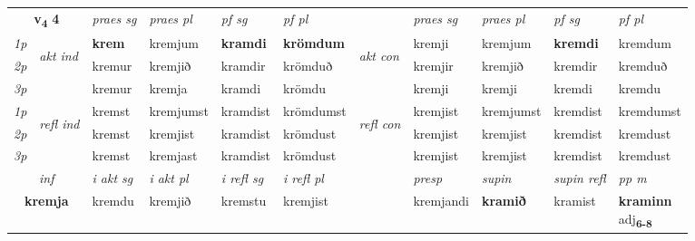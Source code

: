 \noindent
\begin{tabular}{lllllllllll} \toprule
\multicolumn{2}{c}{\textbf{v{\textsubscript{4}}} \Large{\textbf{4}}}  &  \textit{praes sg}  & \textit{praes pl}  &\textit{ pf sg} & \textit{pf pl} &  &  \textit{praes sg}  & \textit{praes pl}  & \textit{pf sg} & \textit{pf pl } \\*
	\cmidrule{3-6} \cmidrule{8-11}
 {\textit{1p}} & \multirow{3}{*}{\begin{turn}{90}\textit{akt ind}\end{turn}} & \textbf{krem} & kremjum & \textbf{kramdi} & \textbf{krömdum} & \multirow{3}{*}{\begin{turn}{90}\textit{akt con}\end{turn}} &kremji & kremjum & \textbf{kremdi} & kremdum\\*
 {\textit{2p}} &  &  kremur  & kremjið & kramdir & krömduð & & kremjir & kremjið & kremdir & kremduð \\*
{\textit{3p}} &  & kremur & kremja & kramdi & krömdu & & kremji & kremji& kremdi & kremdu \\*
\cmidrule{3-6} \cmidrule{8-11}
 {\textit{1p}} & \multirow{3}{*}{\begin{turn}{90}\textit{refl ind}\end{turn}}  & kremst & kremjumst & kramdist & krömdumst & \multirow{3}{*}{\begin{turn}{90}\textit{refl con}\end{turn}}  &kremjist & kremjumst & kremdist & kremdumst \\*
 {\textit{2p}} &  & kremst & kremjist & kramdist & krömdust & &kremjist & kremjist & kremdist & kremdust \\*
 {\textit{3p}}  & & kremst & kremjast & kramdist & krömdust & & kremjist & kremjist& kremdist & kremdust \\*
\cmidrule{3-6} \cmidrule{8-11}

   \multicolumn{2}{c}{\textit{inf}}  & \textit{i akt sg} & \textit{i akt pl} & \textit{i refl sg} & \textit{i refl pl} && \textit{presp} & \textit{supin} & \textit{supin refl} & \textit{pp m} \\*
  \multicolumn{2}{c}{\textbf{kremja}} & kremdu  & kremjið & kremstu & kremjist && kremjandi &  \textbf{kramið} & kramist & \specialcell{\textbf{kraminn} \\ adj\textbf{\textsubscript{6-8}}} \\*
\end{tabular}

